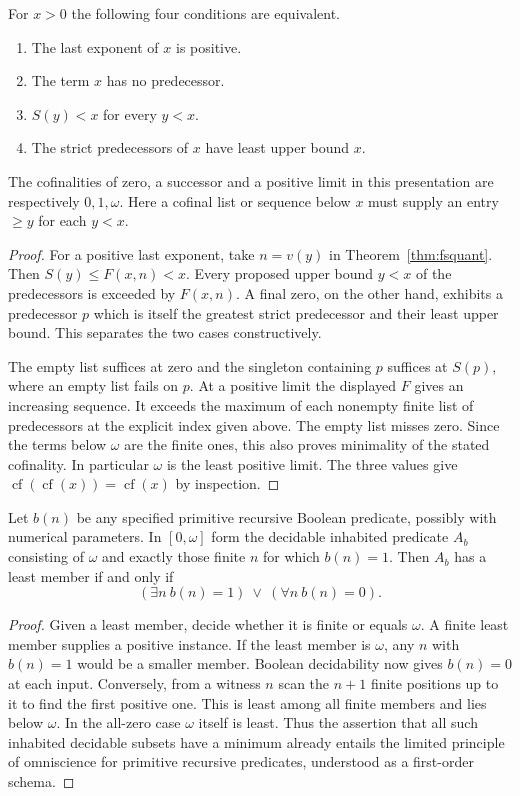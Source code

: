 \begin{corollary}
For $x>0$ the following four conditions are equivalent.
\begin{enumerate}[nosep,label=(\roman*)]
\item The last exponent of $x$ is positive.
\item The term $x$ has no predecessor.
\item $S(y)<x$ for every $y<x$.
\item The strict predecessors of $x$ have least upper bound $x$.
\end{enumerate}
The cofinalities of zero, a successor and a positive limit in this
presentation are respectively $0,1,\omega$. Here a cofinal list or
sequence below $x$ must supply an entry $\ge y$ for each $y<x$.
\end{corollary}
\begin{proof}
For a positive last exponent, take $n=v(y)$ in
Theorem~\ref{thm:fsquant}. Then $S(y)\le F(x,n)<x$.
Every proposed upper bound $y<x$ of the predecessors is exceeded by
$F(x,n)$. A final zero, on the other hand, exhibits a predecessor $p$
which is itself the greatest strict predecessor and their least upper
bound. This separates the two cases constructively.

The empty list suffices at zero and the singleton containing $p$ suffices
at $S(p)$, where an empty list fails on $p$. At a positive limit the
displayed $F$ gives an increasing sequence. It exceeds the maximum of
each nonempty finite list of predecessors at the explicit index given
above. The empty list misses zero. Since the terms below $\omega$ are
the finite ones, this also proves minimality of the stated cofinality.
In particular $\omega$ is the least positive limit. The three values give
$\operatorname{cf}(\operatorname{cf}(x))=\operatorname{cf}(x)$ by
inspection.
\end{proof}

\begin{proposition}
Let $b(n)$ be any specified primitive recursive Boolean predicate,
possibly with numerical parameters. In $[0,\omega]$ form the decidable
inhabited predicate $A_b$ consisting of $\omega$ and exactly those
finite $n$ for which $b(n)=1$. Then $A_b$ has a least member if and
only if
\[
       (\exists n\ b(n)=1)\ \lor\ (\forall n\ b(n)=0).
\]
\end{proposition}
\begin{proof}
Given a least member, decide whether it is finite or equals $\omega$.
A finite least member supplies a positive instance. If the least
member is $\omega$, any $n$ with $b(n)=1$ would be a smaller member.
Boolean decidability now gives $b(n)=0$ at each input. Conversely,
from a witness $n$ scan the $n+1$ finite positions up to it to find
the first positive one. This is least among all finite members and
lies below $\omega$. In the all-zero case $\omega$ itself is least.
Thus the assertion that all such inhabited decidable subsets have a
minimum already entails the limited principle of omniscience for
primitive recursive predicates, understood as a first-order schema.
\end{proof}

